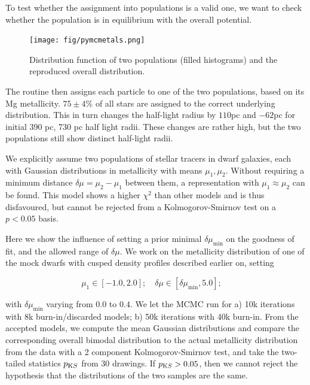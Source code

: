 To test whether the assignment into populations is a valid one, we
want to check whether the population is in equilibrium with the
overall potential.

\begin{figure}
  \begin{center}
    \hspace{-7mm}
    \texttt{[image: fig/pymcmetals.png]}
    \caption{Distribution function of two populations (filled histograms) and the reproduced overall distribution.}
    \label{fig:pops}
  \end{center}
\end{figure}

The routine then assigns each particle to one of the two populations,
based on its Mg metallicity. $75\pm4\%$ of all stars are assigned to
the correct underlying distribution. This in turn changes the
half-light radius by $110$pc and $-62$pc for initial 390 pc, 730 pc
half light radii. These changes are rather high, but the two
populations still show distinct half-light radii.


We explicitly assume two populations of stellar tracers in dwarf
galaxies, each with Gaussian distributions in metallicity with means
$\mu_1,\mu_2$. Without requiring a minimum distance $\delta
\mu=\mu_2-\mu_1$ between them, a representation with $\mu_1 \approx
\mu_2$ can be found. This model shows a higher $\chi^2$ than other
models and is thus disfavoured, but cannot be rejected from a
Kolmogorov-Smirnov test on a $p<0.05$ basis.

Here we show the influence of setting a prior minimal
$\delta\mu_{\min}$ on the goodness of fit, and the allowed range of
$\delta \mu$. We work on the metallicity distribution of one of the
mock dwarfs with cusped density profiles described earlier on, setting

\begin{equation}
\mu_1\in[-1.0,2.0];\quad \delta \mu \in [ \delta\mu_{\min}, 5.0];\quad
\end{equation}

with $\delta\mu_{\min}$ varying from $0.0$ to $0.4$. We let the MCMC
run for a) 10k iterations with 8k burn-in/discarded models; b) 50k
iterations with 40k burn-in. From the accepted models, we compute the
mean Gaussian distributions and compare the corresponding overall
bimodal distribution to the actual metallicity distribution from the
data with a 2 component Kolmogorov-Smirnov test, and take the
two-tailed statistics $p_{\text KS}$ from 30 drawings. If $p_{\text KS}>0.05$, then we
cannot reject the hypothesis that the distributions of the two samples
are the same.

